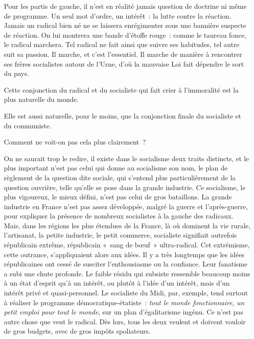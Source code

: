 \documentclass[french,twoside]{book} %
\newcommand{\astermono}{\medskip\centerline{\color{rubric}\large\selectfont{\syms ✻}}\medskip\par}%
\begin{document}
\astermono

\noindent Pour les partis de gauche, il n’est en réalité jamais question de doctrine ni même de programme. Un seul mot d’ordre, un intérêt : la lutte contre la réaction. Jamais un radical bien né ne se laissera enrégimenter sous une bannière suspecte de réaction. On lui montrera une bande d’étoffe rouge : comme le taureau fonce, le radical marchera. Tel radical ne fait ainsi que suivre ses habitudes, tel autre suit sa passion. Il marche, et c’est l’essentiel. Il marche de manière à rencontrer ses frères socialistes autour de l’Urne, d’où la mauvaise Loi fait dépendre le sort du pays.\par
Cette conjonction du radical et du socialiste qui fait crier à l’immoralité est la plus naturelle du monde.\par

\astermono

\noindent Elle est aussi naturelle, pour le moins, que la conjonction finale du socialiste et du communiste.\par
Comment ne voit-on pas cela plus clairement ?\par
On ne saurait trop le redire, il existe dans le socialisme deux traits distincts, et le plus important n’est pas celui qui donne au socialisme son nom, le plan de règlement de la question dite sociale, qui s’entend plus particulièrement de la question ouvrière, telle qu’elle se pose dans la grande industrie. Ce socialisme, le plus vigoureux, le mieux défini, n’est pas celui de gros bataillons. La grande industrie en France n’est pas assez développée, malgré la guerre et l’après-guerre, pour expliquer la présence de nombreux socialistes à la gauche des radicaux. Mais, dans les régions les plus étendues de la France, là où dominent la vie rurale, l’artisanat, la petite industrie, le petit commerce, socialiste signifiait autrefois républicain extrême, républicain « sang de bœuf » ultra-radical. Cet extrémisme, cette outrance, s’appliquaient alors aux idées. Il y a très longtemps que les idées républicaines ont cessé de susciter l’enthousiasme ou la confiance. Leur fanatisme a subi une chute profonde. Le faible résidu qui subsiste ressemble beaucoup moins à un état d’esprit qu’à un intérêt, ou plutôt à l’idée d’un intérêt, mais d’un intérêt privé et quasi-personnel. Le socialiste du Midi, par, exemple, tend surtout à réaliser le programme démocratique-étatiste : \emph{tout le monde fonctionnaire, un petit emploi pour tout le monde}, sur un plan d’égalitarisme ingénu. Ce n’est pas autre chose que veut le radical. Dès lors, tous les deux veulent et doivent vouloir de gros budgets, avec de gros impôts spoliateurs.\par
\end{document}
